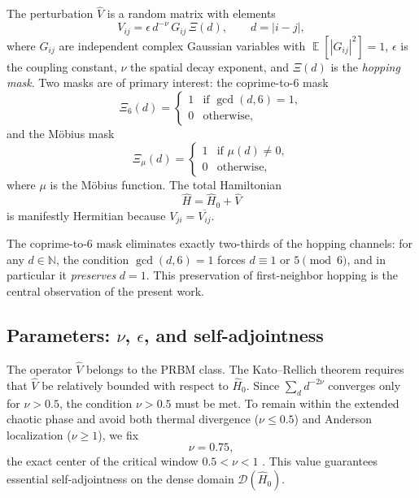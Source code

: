 \documentclass[11pt,a4paper]{article}
\newcommand{\N}{\mathbb{N}}
\DeclareMathOperator{\E}{\mathbb{E}}
\begin{document}
The perturbation $\hat V$ is a random matrix with elements
\begin{equation}
V_{ij} = \epsilon \, d^{-\nu} \, G_{ij} \, \Xi(d),
\qquad d = |i-j|,
\end{equation}
where $G_{ij}$ are independent complex Gaussian variables with $\E[|G_{ij}|^2]=1$, $\epsilon$ is the coupling constant, $\nu$ the spatial decay exponent, and $\Xi(d)$ is the \emph{hopping mask}. Two masks are of primary interest: the coprime-to-6 mask
\begin{equation}
\Xi_6(d) = \begin{cases}
1 & \text{if } \gcd(d,6)=1,\\
0 & \text{otherwise},
\end{cases}
\label{eq:mask6}
\end{equation}
and the Möbius mask
\begin{equation}
\Xi_\mu(d) = \begin{cases}
1 & \text{if } \mu(d) \neq 0,\\
0 & \text{otherwise},
\end{cases}
\label{eq:maskmu}
\end{equation}
where $\mu$ is the Möbius function. The total Hamiltonian
\begin{equation}
\hat H = \hat H_0 + \hat V
\label{eq:fullH}
\end{equation}
is manifestly Hermitian because $V_{ji} = \overline{V_{ij}}$.

The coprime-to-6 mask eliminates exactly two-thirds of the hopping channels: for any $d \in \N$, the condition $\gcd(d,6)=1$ forces $d \equiv 1$ or $5 \pmod 6$, and in particular it \emph{preserves} $d = 1$. This preservation of first-neighbor hopping is the central observation of the present work.

\subsection{Parameters: \texorpdfstring{$\nu$}{nu}, \texorpdfstring{$\epsilon$}{epsilon}, and self-adjointness}

The operator $\hat V$ belongs to the PRBM class. The Kato--Rellich theorem requires that $\hat V$ be relatively bounded with respect to $\hat H_0$. Since $\sum_d d^{-2\nu}$ converges only for $\nu>0.5$, the condition $\nu>0.5$ must be met. To remain within the extended chaotic phase and avoid both thermal divergence ($\nu\le0.5$) and Anderson localization ($\nu\ge1$), we fix
\begin{equation}
\nu = 0.75,
\end{equation}
the exact center of the critical window $0.5<\nu<1$ \cite{Mirlin1996}. This value guarantees essential self-adjointness on the dense domain $\mathcal{D}(\hat H_0)$.
\end{document}
